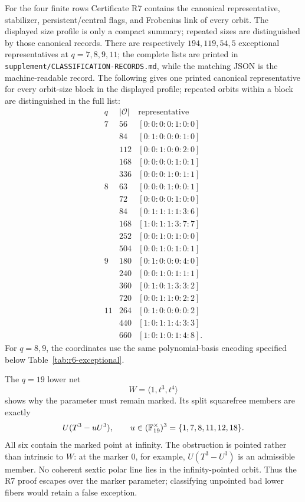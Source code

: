 For the four finite rows Certificate R7 contains the canonical
representative, stabilizer, persistent/central flags, and Frobenius link
of every orbit.  The displayed size profile is only a compact summary;
repeated sizes are distinguished by those canonical records.  There
are respectively \(194,119,54,5\) exceptional representatives at
\(q=7,8,9,11\); the complete lists are printed in
\texttt{supplement/CLASSIFICATION-RECORDS.md}, while the matching JSON
is the machine-readable record.  The following gives one printed
canonical representative for every orbit-size block in the displayed
profile; repeated orbits within a block are distinguished in the full
list:
\[
\begin{array}{c|c|l}
q&|\mathcal O|&\text{representative}\\ \hline
7&56 &[0:0:0:0:1:0:0]\\
 &84 &[0:1:0:0:0:1:0]\\
 &112&[0:0:1:0:0:2:0]\\
 &168&[0:0:0:0:1:0:1]\\
 &336&[0:0:0:1:0:1:1]\\
8&63 &[0:0:0:1:0:0:1]\\
 &72 &[0:0:0:0:1:0:0]\\
 &84 &[0:1:1:1:1:3:6]\\
 &168&[1:0:1:1:3:7:7]\\
 &252&[0:0:1:0:1:0:0]\\
 &504&[0:0:1:0:1:0:1]\\
9&180&[0:1:0:0:0:4:0]\\
 &240&[0:0:1:0:1:1:1]\\
 &360&[0:1:0:1:3:3:2]\\
 &720&[0:0:1:1:0:2:2]\\
11&264&[0:1:0:0:0:0:2]\\
  &440&[1:0:1:1:4:3:3]\\
  &660&[1:0:1:0:1:4:8].
\end{array}
\]
For \(q=8,9\), the coordinates use the same polynomial-basis encoding
specified below Table~\ref{tab:r6-exceptional}.

The \(q=19\) lower net
\[
                 W=\langle1,t^3,t^4\rangle
\]
shows why the parameter must remain marked.  Its split squarefree
members are exactly
\[
 U(T^3-uU^3),\qquad
 u\in(\mathbb F_{19}^{\times})^3=\{1,7,8,11,12,18\}.
\]
All six contain the marked point at infinity.  The obstruction is
pointed rather than intrinsic to \(W\): at the marker \(0\), for
example, \(U(T^3-U^3)\) is an admissible member.  No coherent sextic
polar line lies in the infinity-pointed orbit.  Thus the R7 proof
escapes over the marker parameter; classifying unpointed bad lower
fibers would retain a false exception.

